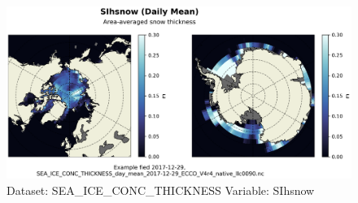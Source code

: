 \begin{figure}[H]
\centering
\includegraphics[width=\textwidth]{../images/plots/native_plots/Sea-Ice_and_Snow_Concentration_and_Thickness/SIhsnow.png}
\caption{Dataset: SEA\_ICE\_CONC\_THICKNESS Variable: SIhsnow}
\label{tab:table-SEA_ICE_CONC_THICKNESS_SIhsnow-Plot}
\end{figure}
\pagebreak
